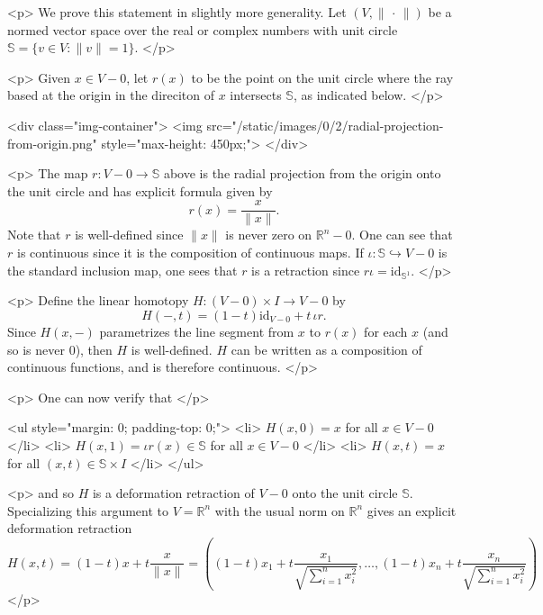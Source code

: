 <p>
    We prove this statement in slightly more generality. Let $(V,\lVert \, \cdot \, \rVert)$ be a normed vector space
    over the
    real or complex numbers with unit circle $\mathbb{S} = \{v \in V : \lVert v \rVert = 1\}$.
</p>

<p>
    Given $x \in V - 0$, let $r(x)$ to be the point on the unit circle
    where the ray based at the origin in the direciton of $x$ intersects $\mathbb{S}$,
    as indicated below.
</p>

<div class="img-container">
    <img src="/static/images/0/2/radial-projection-from-origin.png" style="max-height: 450px;">
</div>

<p>
    The map $r : V - 0 \to \mathbb{S}$ above is the radial projection from the origin
    onto the unit circle and has explicit formula given by
    $$r(x) = \frac{x}{\lVert x \rVert}.$$
    Note that $r$ is well-defined since $\lVert x \rVert$ is never zero on $\mathbb{R}^{n} - 0$.
    One can see that $r$ is continuous since it is the composition of continuous maps. If $\iota : \mathbb{S}
    \hookrightarrow V - 0$ is the standard inclusion map, one sees that $r$ is a retraction since $r\iota =
    \text{id}_{\mathbb{S}^1}$.
</p>

<p>
    Define the linear homotopy $H : (V - 0) \times I \to V - 0$ by
    $$H(-,t) = (1 - t)\text{id}_{V - 0} + t\,\iota r.$$
    Since $H(x,-)$ parametrizes the line segment from $x$ to $r(x)$ for each $x$ (and so is never $0$), then
    $H$ is well-defined. $H$ can be written as a composition of continuous functions, and is therefore
    continuous.
</p>

<p>
    One can now verify that
</p>

<ul style="margin: 0; padding-top: 0;">
    <li>
        $H(x,0) = x$ for all $x \in V - 0$
    </li>
    <li>
        $H(x,1) = \iota r(x) \in \mathbb{S}$ for all $x \in V - 0$
    </li>
    <li>
        $H(x,t) = x$ for all $(x,t) \in \mathbb{S} \times I$
    </li>
</ul>

<p>
    and so $H$ is a deformation retraction of $V - 0$ onto the unit circle $\mathbb{S}$. Specializing this argument to
    $V = \mathbb{R}^n$ with the usual norm on $\mathbb{R}^n$ gives an explicit deformation retraction
    $$H(x,t) = (1-t)x + t\frac{x}{\lVert x \rVert} = \left((1-t)x_1 + t\frac{x_1}{\sqrt{\sum_{i =
    1}^nx_i^2}},\dots,(1-t)x_n + t\frac{x_n}{\sqrt{\sum_{i = 1}^nx_i^2}}\right)$$
</p>